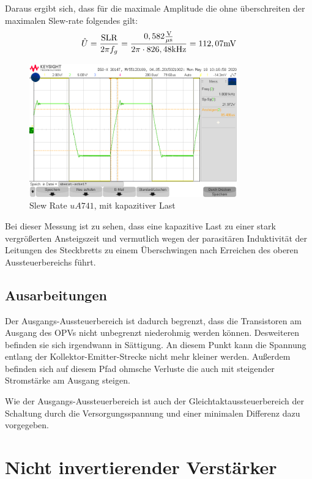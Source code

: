 Daraus ergibt sich, dass für die maximale Amplitude die ohne überschreiten der maximalen Slew-rate folgendes gilt:
\begin{align}
    \hat{U}=\frac{\text{SLR}}{2\pi f_g}=\frac{0,582 \frac{\text{V}}{\mu\text{s}}}{2\pi \cdot 826,48\text{kHz}} =112,07\text{mV} 
\end{align}
\begin{figure}[H]
    \centering
    \includegraphics[width=0.8\textwidth]{Lab_1/Messungen/Folger/uberst-schw17.png}
    \caption{Slew Rate $uA741$,  mit kapazitiver Last}
    \label{fig:res_Folger_slew_rate_kap_last}
\end{figure}
Bei dieser Messung ist zu sehen, dass eine kapazitive Last zu einer stark vergrößerten Ansteigszeit und vermutlich wegen der parasitären Induktivität der Leitungen des Steckbretts zu einem Überschwingen nach Erreichen des oberen Aussteuerbereichs führt.

\subsection{Ausarbeitungen}
Der Ausgangs-Aussteuerbereich ist dadurch begrenzt, dass die Transistoren am Ausgang des OPVs nicht unbegrenzt niederohmig werden können. Desweiteren befinden sie sich irgendwann in Sättigung. An diesem Punkt kann die Spannung entlang der Kollektor-Emitter-Strecke nicht mehr kleiner werden. Außerdem befinden sich auf diesem Pfad ohmsche Verluste die auch mit steigender Stromstärke am Ausgang steigen.

Wie der Ausgangs-Aussteuerbereich ist auch der Gleichtaktaussteuerbereich der Schaltung durch die Versorgungsspannung und einer minimalen Differenz dazu vorgegeben.
\section{Nicht invertierender Verstärker}
